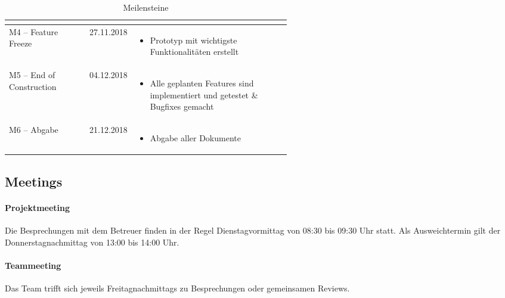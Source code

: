 \begin{table}[H]
\begin{tabular}{|l|c|p{0.55\linewidth}|}
\begin{itemize}
            \vspace{-\topsep}
        \end{itemize} \\ \hline
        M4 – Feature Freeze & 27.11.2018 &
        \vspace{-7mm}
        \begin{itemize}
            \setlength\itemsep{0mm}
            \item Prototyp mit wichtigste Funktionalitäten erstellt
            \vspace{-\topsep}
        \end{itemize} \\ \hline
        M5 – End of Construction & 04.12.2018 &
        \vspace{-7mm}
        \begin{itemize}
            \setlength\itemsep{0mm}
            \item Alle geplanten Features sind implementiert und getestet \& Bugfixes gemacht
            \vspace{-\topsep}
        \end{itemize} \\ \hline
        M6 – Abgabe & 21.12.2018 & 
        \vspace{-7mm}
        \begin{itemize}
            \setlength\itemsep{0mm}
            \item Abgabe aller Dokumente
            \vspace{-\topsep}
        \end{itemize} \\ \hline

    \end{tabular}
    \caption{Meilensteine}
\end{table}


\subsection{Meetings}
\paragraph{Projektmeeting}
Die Besprechungen mit dem Betreuer finden in der Regel Dienstagvormittag von 08:30 bis 09:30 Uhr statt. Als Ausweichtermin gilt der Donnerstagnachmittag von 13:00 bis 14:00 Uhr.
\paragraph{Teammeeting}
Das Team trifft sich jeweils Freitagnachmittags zu Besprechungen oder gemeinsamen Reviews.
